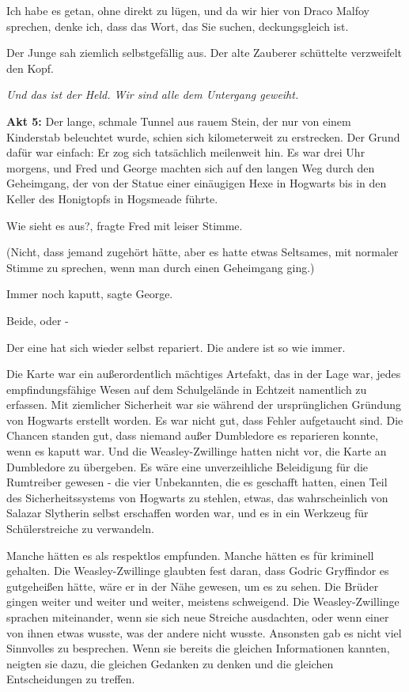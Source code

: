 \glqq Ich habe es getan, ohne direkt zu lügen, und da wir hier von Draco Malfoy
sprechen, denke ich, dass das Wort, das Sie suchen, deckungsgleich ist.\grqq{}

Der Junge sah ziemlich selbstgefällig aus. Der alte Zauberer schüttelte
verzweifelt den Kopf.

\glqq \emph{Und das ist der Held. Wir sind alle dem Untergang geweiht.}\grqq{}

\textbf{Akt 5:} Der lange, schmale Tunnel aus rauem Stein, der nur von einem
Kinderstab beleuchtet wurde, schien sich kilometerweit zu erstrecken. Der Grund
dafür war einfach: Er zog sich tatsächlich meilenweit hin. Es war drei Uhr
morgens, und Fred und George machten sich auf den langen Weg durch den
Geheimgang, der von der Statue einer einäugigen Hexe in Hogwarts bis in den
Keller des Honigtopfs in Hogsmeade führte.

\glqq Wie sieht es aus?\grqq{}, fragte Fred mit leiser Stimme.

(Nicht, dass jemand zugehört hätte, aber es hatte etwas Seltsames, mit normaler
Stimme zu sprechen, wenn man durch einen Geheimgang ging.)

\glqq Immer noch kaputt\grqq{}, sagte George.

\glqq Beide, oder -\grqq{}

\glqq Der eine hat sich wieder selbst repariert. Die andere ist so wie
immer.\grqq{}

Die Karte war ein außerordentlich mächtiges Artefakt, das in der Lage war, jedes
empfindungsfähige Wesen auf dem Schulgelände in Echtzeit namentlich zu erfassen.
Mit ziemlicher Sicherheit war sie während der ursprünglichen Gründung von
Hogwarts erstellt worden. Es war nicht gut, dass Fehler aufgetaucht sind. Die
Chancen standen gut, dass niemand außer Dumbledore es reparieren konnte, wenn es
kaputt war. Und die Weasley-Zwillinge hatten nicht vor, die Karte an Dumbledore
zu übergeben. Es wäre eine unverzeihliche Beleidigung für die Rumtreiber gewesen
- die vier Unbekannten, die es geschafft hatten, einen Teil des
Sicherheitssystems von Hogwarts zu stehlen, etwas, das wahrscheinlich von
Salazar Slytherin selbst erschaffen worden war, und es in ein Werkzeug für
Schülerstreiche zu verwandeln.

Manche hätten es als respektlos empfunden. Manche hätten es für kriminell
gehalten. Die Weasley-Zwillinge glaubten fest daran, dass Godric Gryffindor es
gutgeheißen hätte, wäre er in der Nähe gewesen, um es zu sehen. Die Brüder
gingen weiter und weiter und weiter, meistens schweigend. Die Weasley-Zwillinge
sprachen miteinander, wenn sie sich neue Streiche ausdachten, oder wenn einer
von ihnen etwas wusste, was der andere nicht wusste. Ansonsten gab es nicht viel
Sinnvolles zu besprechen. Wenn sie bereits die gleichen Informationen kannten,
neigten sie dazu, die gleichen Gedanken zu denken und die gleichen
Entscheidungen zu treffen.

